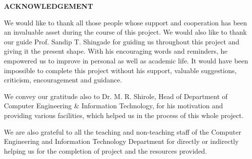 \begin{center}
    {\textbf{ACKNOWLEDGEMENT}}\\ \vspace{1cm}
\end{center}
\par We would like to thank all those people whose support and cooperation has been an invaluable asset during the course of this project. We would also like to thank our guide Prof. Sandip T. Shingade for guiding us throughout this project and giving it the present shape. With his encouraging words and reminders, he empowered us to improve in personal as well as academic life. It would have been impossible to complete this project without his support, valuable suggestions, criticism, encouragement and guidance.

\par We convey our gratitude also to Dr. M. R. Shirole, Head of Department of Computer Engineering \& Information Technology, for his motivation and providing various facilities, which helped us in the process of this whole project.

\par We are also grateful to all the teaching and non-teaching staff of the Computer Engineering and Information Technology Department for directly or indirectly helping us for the completion of project and the resources provided.